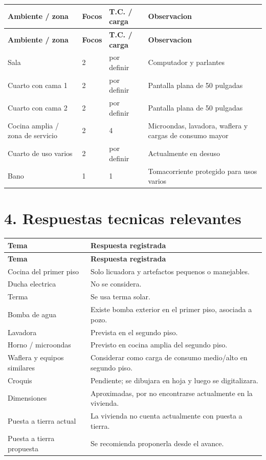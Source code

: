\documentclass[12pt,a4paper]{article}
\begin{document}
\begin{longtable}{L{4cm}R{2cm}L{3cm}L{5.2cm}}
\toprule
\textbf{Ambiente / zona} & \textbf{Focos} & \textbf{T.C. / carga} & \textbf{Observacion} \\
\midrule
\endfirsthead
\toprule
\textbf{Ambiente / zona} & \textbf{Focos} & \textbf{T.C. / carga} & \textbf{Observacion} \\
\midrule
\endhead
Sala & 2 & por definir & Computador y parlantes \\
Cuarto con cama 1 & 2 & por definir & Pantalla plana de 50 pulgadas \\
Cuarto con cama 2 & 2 & por definir & Pantalla plana de 50 pulgadas \\
Cocina amplia / zona de servicio & 2 & 4 & Microondas, lavadora, waflera y cargas de consumo mayor \\
Cuarto de uso varios & 2 & por definir & Actualmente en desuso \\
Bano & 1 & 1 & Tomacorriente protegido para usos varios \\
\bottomrule
\end{longtable}

\section*{4. Respuestas tecnicas relevantes}

\begin{longtable}{L{5cm}L{9.2cm}}
\toprule
\textbf{Tema} & \textbf{Respuesta registrada} \\
\midrule
\endfirsthead
\toprule
\textbf{Tema} & \textbf{Respuesta registrada} \\
\midrule
\endhead
Cocina del primer piso & Solo licuadora y artefactos pequenos o manejables. \\
Ducha electrica & No se considera. \\
Terma & Se usa terma solar. \\
Bomba de agua & Existe bomba exterior en el primer piso, asociada a pozo. \\
Lavadora & Prevista en el segundo piso. \\
Horno / microondas & Previsto en cocina amplia del segundo piso. \\
Waflera y equipos similares & Considerar como carga de consumo medio/alto en segundo piso. \\
Croquis & Pendiente; se dibujara en hoja y luego se digitalizara. \\
Dimensiones & Aproximadas, por no encontrarse actualmente en la vivienda. \\
Puesta a tierra actual & La vivienda no cuenta actualmente con puesta a tierra. \\
Puesta a tierra propuesta & Se recomienda proponerla desde el avance. \\
\bottomrule
\end{longtable}
\end{document}
